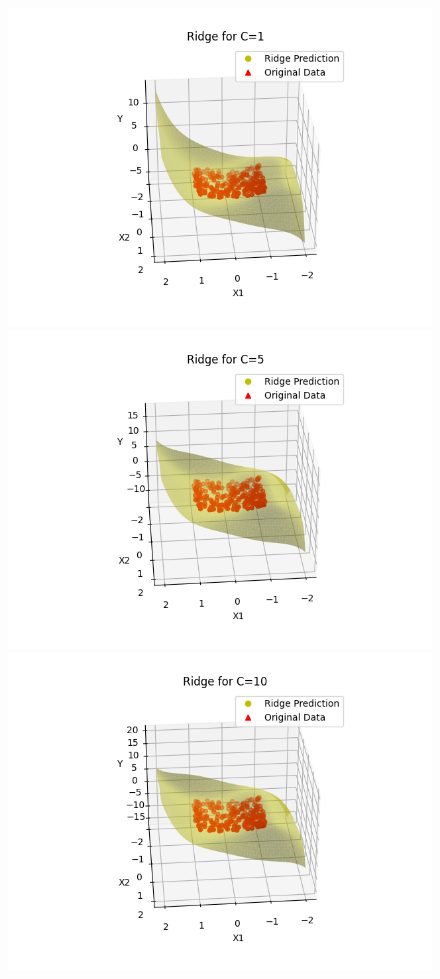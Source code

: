 \documentclass[10pt]{article}
\begin{document}
\begin{figure}[H]
  \begin{center}
    \includegraphics[scale=0.4]{./images/Figure_3_1.png}
    \includegraphics[scale=0.4]{./images/Figure_3_5.png}
    \includegraphics[scale=0.4]{./images/Figure_3_10.png}

\end{center}
\end{figure}
\end{document}
